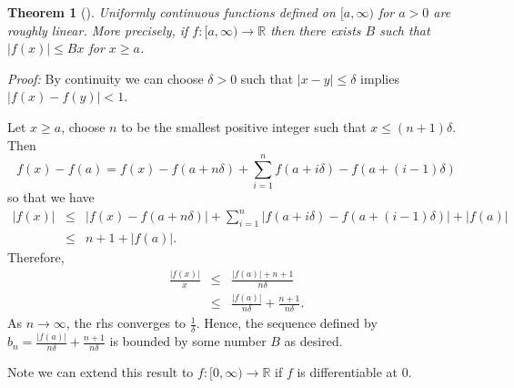 \documentclass[12pt]{article}
\begin{document}
\newtheorem{thm}{Theorem}
\begin{thm}[]
Uniformly continuous functions defined on $[a,\infty)$ for $a >0$ are roughly linear. More precisely, if $f:[a,\infty) \to \mathbb{R}$ then there exists 
$B$ such that $|f(x)| \leq B x$ for $x\geq a$. 
\end{thm}

\emph{Proof:} By  continuity we can choose $\delta>0$ such that $|x-y| \leq \delta$ implies $ |f(x)-f(y)|<1$. 
 
 Let $x \geq a$, choose $n$ to be the smallest positive integer such that
$x \leq (n+1)\delta$. Then
$$
f(x) -f(a) = f(x) - f(a+n\delta) + \sum_{i=1}^n f(a+i\delta)-f(a+(i-1)\delta)
$$
so that we have
\begin{eqnarray}
|f(x)| &\leq& |f(x)-f(a+n\delta)| + \sum_{i=1}^n |f(a+i\delta)-f(a+(i-1)\delta)| + |f(a)| \\
&\leq& n+ 1+ |f(a)|. 
\end{eqnarray}
Therefore,
\begin{eqnarray}
\frac{|f(x)|}{x} &\leq& \frac{|f(a)| + n+1}{n\delta}\\
 &\leq& \frac{|f(a)|}{n\delta} + \frac{n+1}{n\delta}. 
\end{eqnarray}
As $n\to \infty$, the rhs converges to $\frac{1}{\delta}$. 
Hence, the sequence defined by
$b_n = \frac{|f(a)|}{n\delta} + \frac{n+1}{n\delta}$ is bounded by some 
number $B$ as desired.

Note we can extend this result to $f:[0,\infty)\to \mathbb{R}$ if $f$ is differentiable at 0.
\end{document}
